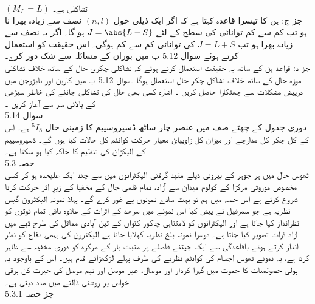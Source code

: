     \((M_{L}=L)\)
      تشاکلی ہے۔\\
      جز ج: ہن کا تیسرا قاعدہ کہتا ہے کہ اگر ایک ذیلی خول 
   \((n,l)\)
       نصف سے زیادہ بھرا نا ہو تب کم سے کم توانائی کی سطح کے لئے 
    \(J=\abs{L-S}\)
        ہو گا۔ اگر یہ نصف سے زیادہ بھرا ہو تب
\( J=L+S\)
 کی توانائی کم سے کم ہوگی۔ اس حقیقت کو استعمال کرتے ہوئے سوال 5.12 ب میں بوران کے مسائلہ سے شک دور کرے۔\\ 
جز د: قواعد ہن کے ساتھ یہ حقیقت استعمال کرتے ہوئے کہ تشاکلی چکری حال کے ساتھ خلاف تشاکلی موزہ حال کے ساتھ خلاف تشاکل چکر حال استعمال ہوگا ۔سوال 5.12 ب میں کاربن اور نایڑوجن میں درپیش مشکلات سے چھٹکارا حاصل کریں ۔ اشارہ کسی بھی حال کی تشاکلی جاننے کی خاطر سیڑھی کے بالائی سر سے آغاز کریں ۔\\
 سوال 5.14\\
  دوری جدول کے چھٹے صف میں عنصر چار ساٹھ ڈسپروسییم کا زمینی حال
  \(^{5}I_{8}\) 
  ہے۔ اس کے کل چکر کل مدارچے اور میزان کل زاوییائ معیار حرکت کوانٹم کل حالات کیا ہوں گے۔ ڈسپروسییم کے الیکڑان  کی تنظیم کا خاکہ کیا ہو سکتا ہے۔\\
حصہ
 5.3\\
 
ٹھوس حال میں ہر جوہر کے بیرونی ڈیلے مقید گرفتی الیکٹرانوں میں سے چند ایک علیحدہ ہو کر کسی مخصوص موروثی مرکزا کے کولوم میدان سے آزاد، تمام قلمی جال کے مخفیا کے زیرِ اثر حرکت کرنا شروع کرتے ہے اس حصہ میں ہم تو بہت سادے نمونوں پے غور کرے گے۔ پہلا نمونہ الیکٹرون گیس نظریہ ہے جو سمرفيل نے پیش کیا اس نمونے میں سرحد کے اثرات کے علاوہ باقی تمام قوتوں کو نظرانداز کیا جاتا ہے اور الیکٹرانوں کو لامتناہی چاکور کنواں کے تین آبادی مماثل کی طرح ڈبے میں آزاد ذرات تصویر کیا جاتا ہے۔ دوسرا نمونہ بلخ نظریہ کہلایا جاتا ہے الیکٹرون کی بہمی دفاع کو نظر انداز کرتے ہوئے باقاعدگی سے ایک جیتنے فاصلے پر مثبت بار کے مرکزہ کو دوری مخفیہ سے ظاہر کرتا ہے، یہ نمونے ٹھوس اجسام کی کوانٹم نظریے کی طرف پہلے لڑکھڑاتے قدم ہیں۔ اس کے باوجود یہ پولی حصولمنات کا جموت میں گہرا کردار اور موصال، غیر موصل اور نیم موصل کی حیرت کن برقی خواص پر روشنی ڈالنے میں مدد دیتی ہے۔\\
جز حصہ
 5.3.1\\
 
